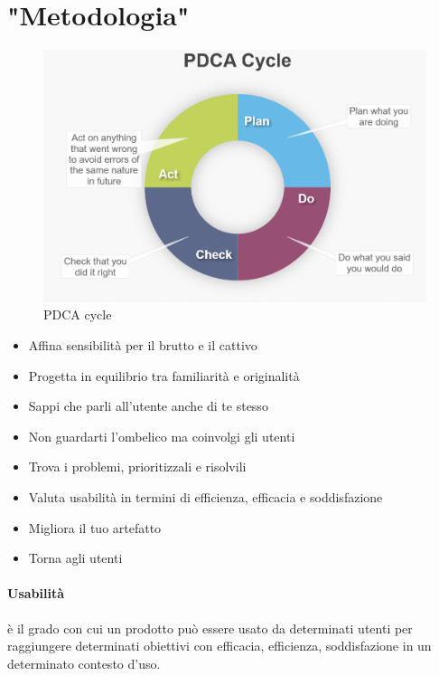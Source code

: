 \documentclass[11pt,a4paper]{book}
\begin{document}
\section{"Metodologia"}
\begin{figure}[h!]
	\begin{center}
		\includegraphics[scale=0.4]{img/011.png}
		\caption{PDCA cycle}
		\label{fig: 011}
	\end{center}
\end{figure}
\begin{itemize}
	\item Affina sensibilità per il brutto e il cattivo
	\item Progetta in equilibrio tra familiarità e originalità
	\item Sappi che parli all'utente anche di te stesso
	\item Non guardarti l'ombelico ma coinvolgi gli utenti
	\item Trova i problemi, prioritizzali e risolvili
	\item Valuta usabilità in termini di efficienza, efficacia e soddisfazione
	\item Migliora il tuo artefatto
	\item Torna agli utenti
\end{itemize}

\paragraph{Usabilità}
è il grado con cui un prodotto può essere usato da determinati utenti per raggiungere determinati obiettivi con efficacia, efficienza, soddisfazione in un determinato contesto d'uso.
\end{document}
